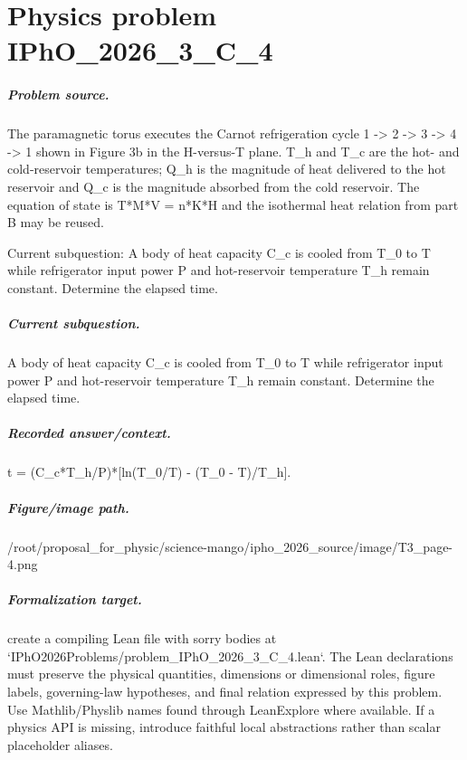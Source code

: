 
\chapter{Physics problem IPhO\_2026\_3\_C\_4}
\label{ch:IPhO2026Problems_problem_IPhO_2026_3_C_4}

\paragraph{Problem source.}
The paramagnetic torus executes the Carnot refrigeration cycle
1 -> 2 -> 3 -> 4 -> 1 shown in Figure 3b in the H-versus-T plane.  T\_h and T\_c
are the hot- and cold-reservoir temperatures; Q\_h is the magnitude of heat
delivered to the hot reservoir and Q\_c is the magnitude absorbed from the cold
reservoir.  The equation of state is T*M*V = n*K*H and the isothermal heat
relation from part B may be reused.

Current subquestion:
A body of heat capacity C\_c is cooled from T\_0 to T while refrigerator input power P and hot-reservoir temperature T\_h remain constant. Determine the elapsed time.

\paragraph{Current subquestion.}
A body of heat capacity C\_c is cooled from T\_0 to T while refrigerator input power P and hot-reservoir temperature T\_h remain constant. Determine the elapsed time.

\paragraph{Recorded answer/context.}
t = (C\_c*T\_h/P)*[ln(T\_0/T) - (T\_0 - T)/T\_h].

\paragraph{Figure/image path.}
/root/proposal\_for\_physic/science-mango/ipho\_2026\_source/image/T3\_page-4.png

\paragraph{Formalization target.}
create a compiling Lean file with sorry bodies at `IPhO2026Problems/problem\_IPhO\_2026\_3\_C\_4.lean`. The Lean declarations must preserve the physical quantities, dimensions or dimensional roles, figure labels, governing-law hypotheses, and final relation expressed by this problem.
Use Mathlib/Physlib names found through LeanExplore where available. If a physics API is missing, introduce faithful local abstractions rather than scalar placeholder aliases.

